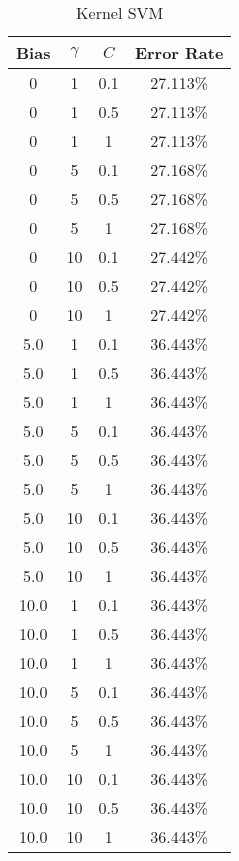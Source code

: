\begin{center}
\begin{longtable}{|c|c|c|c|}
\caption{Kernel SVM}\label{tab:svm_rbf_acctable}\\
\hline
Bias & $\gamma$ & $C$ & Error Rate \\
\hline
0 & 1 & 0.1 & 27.113\% \\
\hline
0 & 1 & 0.5 & 27.113\% \\
\hline
0 & 1 & 1 & 27.113\% \\
\hline
0 & 5 & 0.1 & 27.168\% \\
\hline
0 & 5 & 0.5 & 27.168\% \\
\hline
0 & 5 & 1 & 27.168\% \\
\hline
0 & 10 & 0.1 & 27.442\% \\
\hline
0 & 10 & 0.5 & 27.442\% \\
\hline
0 & 10 & 1 & 27.442\% \\
\hline
5.0 & 1 & 0.1 & 36.443\% \\
\hline
5.0 & 1 & 0.5 & 36.443\% \\
\hline
5.0 & 1 & 1 & 36.443\% \\
\hline
5.0 & 5 & 0.1 & 36.443\% \\
\hline
5.0 & 5 & 0.5 & 36.443\% \\
\hline
5.0 & 5 & 1 & 36.443\% \\
\hline
5.0 & 10 & 0.1 & 36.443\% \\
\hline
5.0 & 10 & 0.5 & 36.443\% \\
\hline
5.0 & 10 & 1 & 36.443\% \\
\hline
10.0 & 1 & 0.1 & 36.443\% \\
\hline
10.0 & 1 & 0.5 & 36.443\% \\
\hline
10.0 & 1 & 1 & 36.443\% \\
\hline
10.0 & 5 & 0.1 & 36.443\% \\
\hline
10.0 & 5 & 0.5 & 36.443\% \\
\hline
10.0 & 5 & 1 & 36.443\% \\
\hline
10.0 & 10 & 0.1 & 36.443\% \\
\hline
10.0 & 10 & 0.5 & 36.443\% \\
\hline
10.0 & 10 & 1 & 36.443\% \\
\hline
\hline
\end{longtable}
\end{center}
